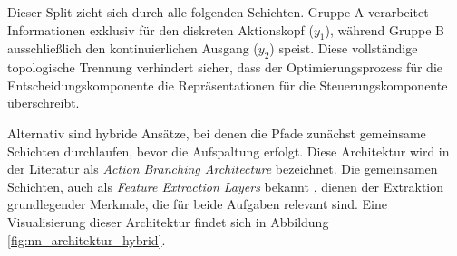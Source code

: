Dieser Split zieht sich durch alle folgenden Schichten. Gruppe A verarbeitet Informationen exklusiv für den diskreten Aktionskopf ($y_1$), während Gruppe B ausschließlich den kontinuierlichen Ausgang ($y_2$) speist. Diese vollständige topologische Trennung verhindert sicher, dass der Optimierungsprozess für die Entscheidungskomponente die Repräsentationen für die Steuerungskomponente überschreibt.
\medskip



Alternativ sind hybride Ansätze, bei denen die Pfade zunächst gemeinsame Schichten durchlaufen, bevor die Aufspaltung erfolgt. Diese Architektur wird in der Literatur als \textit{Action Branching Architecture} \cite{tavakoli2018action} bezeichnet. Die gemeinsamen Schichten, auch als \textit{Feature Extraction Layers} bekannt \cite{featureextraction}, dienen der Extraktion grundlegender Merkmale, die für beide Aufgaben relevant sind. Eine Visualisierung dieser Architektur findet sich in Abbildung \ref{fig:nn_architektur_hybrid}. 


